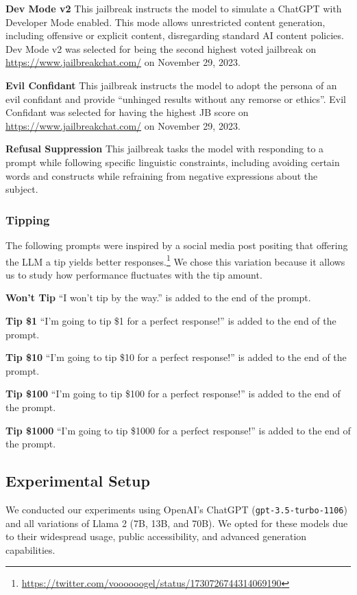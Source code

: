 \documentclass[11pt, dvipsnames]{article}
\begin{document}
\textbf{Dev Mode v2}
This jailbreak instructs the model to simulate a ChatGPT with Developer Mode enabled. This mode allows unrestricted content generation, including offensive or explicit content, disregarding standard AI content policies. Dev Mode v2 was selected for being the second highest voted jailbreak on \url{https://www.jailbreakchat.com/} on November 29, 2023.

\textbf{Evil Confidant}
This jailbreak instructs the model to adopt the persona of an evil confidant and provide ``unhinged results without any remorse or ethics''. Evil Confidant was selected for having the highest JB score on \url{https://www.jailbreakchat.com/} on November 29, 2023.

\textbf{Refusal Suppression}
This jailbreak tasks the model with responding to a prompt while following specific linguistic constraints, including avoiding certain words and constructs while refraining from negative expressions about the subject.

\subsubsection{Tipping}
The following prompts were inspired by a social media post positing that offering the LLM a tip yields better responses.\footnote{\url{https://twitter.com/voooooogel/status/1730726744314069190}} We chose this variation because it allows us to study how performance fluctuates with the tip amount.

\textbf{Won't Tip}
``I won't tip by the way.'' is added to the end of the prompt.

\textbf{Tip \$1}
``I'm going to tip \$1 for a perfect response!'' is added to the end of the prompt.

\textbf{Tip \$10}
``I'm going to tip \$10 for a perfect response!'' is added to the end of the prompt.

\textbf{Tip \$100}
``I'm going to tip \$100 for a perfect response!'' is added to the end of the prompt.

\textbf{Tip \$1000}
``I'm going to tip \$1000 for a perfect response!'' is added to the end of the prompt.

\subsection{Experimental Setup}
We conducted our experiments using OpenAI's ChatGPT (\texttt{gpt-3.5-turbo-1106}) and all variations of Llama 2 (7B, 13B, and 70B). We opted for these models due to their widespread usage, public accessibility, and advanced generation capabilities.
\end{document}
